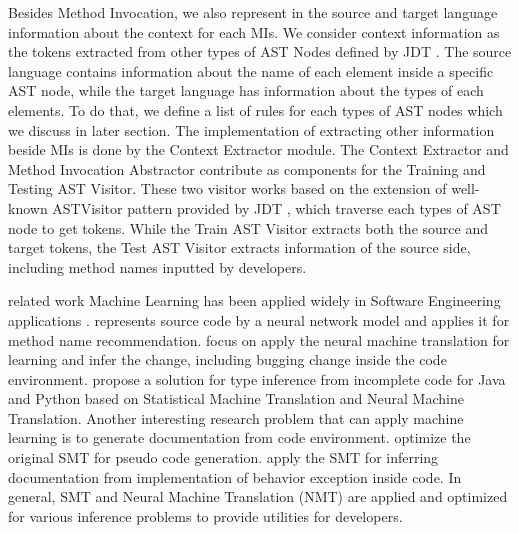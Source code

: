 Besides Method Invocation, we also represent in the source and target language information about the context for each MIs. We consider context information as the tokens extracted from other types of AST Nodes defined by JDT \cite{id:ASTDocumentation}. The source language contains information about the name of each element inside a specific AST node, while the target language has information about the types of each elements. To do that, we define a list of rules for each types of AST nodes which we discuss in later section. The implementation of extracting other information beside MIs is done by the Context Extractor module. The Context Extractor and Method Invocation Abstractor contribute as components for the Training and Testing AST Visitor. These two visitor works based on the extension of well-known ASTVisitor pattern provided by JDT \cite{id:ASTDocumentation}, which traverse each types of AST node to get tokens. While the Train AST Visitor extracts both the source and target tokens, the Test AST Visitor extracts information of the source side, including method names inputted by developers.




related work
Machine Learning has been applied widely in Software Engineering applications \cite{Allamanis:2018:SML:3236632.3212695}. \cite{DBLP:journals/corr/abs-1803-09473} represents source code by a neural network model and applies it for method name recommendation. \cite{DBLP:journals/corr/abs-1812-07170,DBLP:journals/corr/abs-1901-09102} focus on apply the neural machine translation for learning and infer the change, including bugging change inside the code environment. \cite{8453132,Hellendoorn:2018:DLT:3236024.3236051} propose a solution for type inference from incomplete code for Java and Python based on Statistical Machine Translation and Neural Machine Translation. Another interesting research problem that can apply machine learning is to generate documentation from code environment.  \cite{Oda:2015:LGP:2916135.2916173} optimize the original SMT for pseudo code generation. \cite{Phan:2017:SLI:3102962.3102971} apply the SMT for inferring documentation from implementation of behavior exception inside code. In general, SMT and Neural Machine Translation (NMT) are applied and optimized for various inference problems to provide utilities for developers.
\\